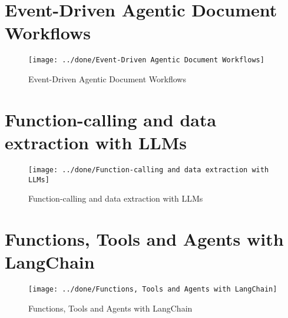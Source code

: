 \documentclass[a4paper,12pt]{article}
\begin{document}
\section*{Event-Driven Agentic Document Workflows}
\begin{figure}[h]
	\centering
	\vspace{-10pt} %
	\texttt{[image: ../done/Event-Driven Agentic Document Workflows]}
	\vspace{-10pt} %
	\caption{Event-Driven Agentic Document Workflows}
	\vspace{-10pt} %
\end{figure}


\section*{Function-calling and data extraction with LLMs}
\vspace{-10pt} %
\begin{figure}[h]
	\centering
	\vspace{-10pt} %
	\texttt{[image: ../done/Function-calling and data extraction with LLMs]}
	\vspace{-10pt} %
	\caption{Function-calling and data extraction with LLMs}
	\vspace{-10pt} %
\end{figure}
\newpage
\section*{Functions, Tools and Agents with LangChain}
\vspace{-10pt} %
\begin{figure}[h]
	\centering
	\vspace{-10pt} %
	\texttt{[image: ../done/Functions, Tools and Agents with LangChain]}
	\vspace{-10pt} %
	\caption{Functions, Tools and Agents with LangChain}
	\vspace{-10pt} %
\end{figure}
\end{document}
